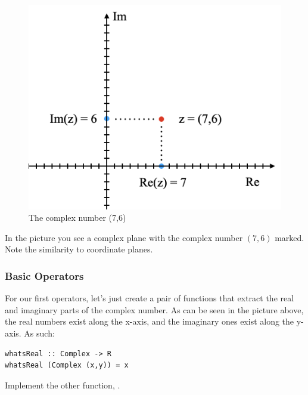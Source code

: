 \begin{figure}[h!]
    \centering
    \includegraphics[scale= 0.4]{Argand.png}
    \caption{The complex number (7,6)}
    \label{argand}
\end{figure}


In the picture you see a complex plane with the complex number $(7,6)$ marked. Note the similarity to coordinate planes. 

\subsubsection{Basic Operators}

For our first operators, let's just create a pair of functions that extract the real and imaginary parts of the complex number. As can be seen in the picture above, the real numbers exist along the x-axis, and the imaginary ones exist along the y-axis. As such:
\begin{verbatim}
whatsReal :: Complex -> R
whatsReal (Complex (x,y)) = x

\end{verbatim}

\begin{exercise}
Implement the other function, . 
\end{exercise}

